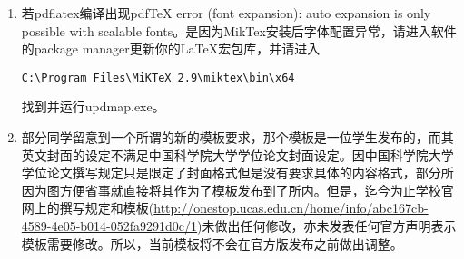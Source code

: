 \begin{enumerate}
\begin{itemize}
      这一命令使产生空白页的机制失效。这一方案将移除所有的空白页，包括封面处的。但与方案一不同的是，页面页脚的设定可以区分奇偶页。
  \item 在thesis.tex的documentclass中添加openany选项(openany与doublesided和printcopy都可搭配)。这一命令使章可以开始于任意页。同时，将custom.sty中86行和thesis.tex中88行附近的cleardoublepage改为clearpage。此方案将移除所有的用于调整章的起始位置的空白页，而不包括封面处的。同时，页面页脚的设定可以区分奇偶页。
\end{itemize}
      无论哪种方案都需要注意对页眉页脚的影响并做出合适的调整。个人的推荐是采用默认设置，尽量避免将精力花在这些无关紧要的细节上。\LaTeX{}的特点是标准化，而其导致的问题则是任何脱离标准的修改都将花费相当的精力。对于电子档的论文，在thesis.tex的documentclass中，若不想使用doublesided，则可使用singlesided来减少空白页。而对于打印版，启用printcopy选项以替换doublesided/singlesided选项，这样可使奇偶页的排版在打印装订后更美观。
  \item 若pdflatex编译出现pdfTeX error (font expansion): auto expansion is only possible with scalable fonts。是因为MikTex安装后字体配置异常，请进入软件的package manager更新你的\LaTeX{}宏包库，并请进入
      
      \verb+C:\Program Files\MiKTeX 2.9\miktex\bin\x64+

       找到并运行updmap.exe。
    \item 部分同学留意到一个所谓的新的模板要求，那个模板是一位学生发布的，而其英文封面的设定不满足中国科学院大学学位论文封面设定。因中国科学院大学学位论文撰写规定只是限定了封面格式但是没有要求具体的内容格式，部分所因为图方便省事就直接将其作为了模板发布到了所内。但是，迄今为止学校官网上的撰写规定和模板(\url{http://onestop.ucas.edu.cn/home/info/abc167cb-4589-4e05-b014-052fa9291d0c/1})未做出任何修改，亦未发表任何官方声明表示模板需要修改。所以，当前模板将不会在官方版发布之前做出调整。
\end{enumerate}

\nocite{*}%
